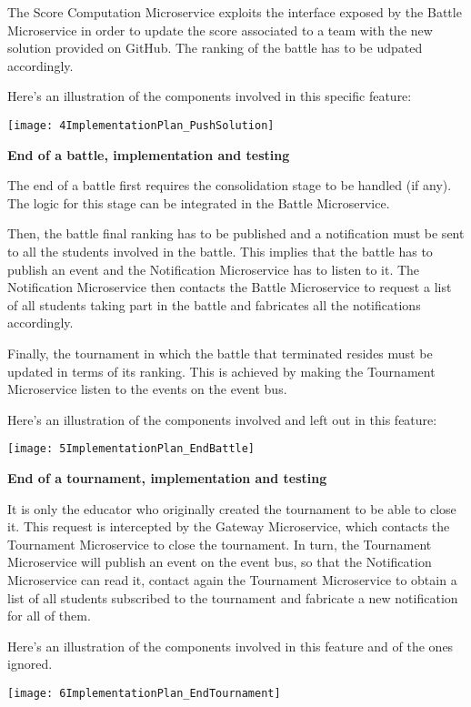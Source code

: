 The Score Computation Microservice exploits the interface exposed by the Battle Microservice in order to update the score associated to a team with the new solution provided on GitHub. The ranking of the battle has to be udpated accordingly.

Here's an illustration of the components involved in this specific feature:

\begin{center}
	\texttt{[image: 4ImplementationPlan\_PushSolution]}
\end{center}

\textbf{End of a battle, implementation and testing}

The end of a battle first requires the consolidation stage to be handled (if any). The logic for this stage can be integrated in the Battle Microservice.

Then, the battle final ranking has to be published and a notification must be sent to all the students involved in the battle. This implies that the battle has to publish an event and the Notification Microservice has to listen to it. The Notification Microservice then contacts the Battle Microservice to request a list of all students taking part in the battle and fabricates all the notifications accordingly.


Finally, the tournament in which the battle that terminated resides must be updated in terms of its ranking. This is achieved by making the Tournament Microservice listen to the events on the event bus.

Here's an illustration of the components involved and left out in this feature:

\begin{center}
	\texttt{[image: 5ImplementationPlan\_EndBattle]}
\end{center}

\textbf{End of a tournament, implementation and testing}

It is only the educator who originally created the tournament to be able to close it. This request is intercepted by the Gateway Microservice, which contacts the Tournament Microservice to close the tournament. 
In turn, the Tournament Microservice will publish an event on the event bus, so that the Notification Microservice can read it, contact again the Tournament Microservice to obtain a list of all students subscribed to the tournament and fabricate a new notification for all of them.

Here's an illustration of the components involved in this feature and of the ones ignored.

\begin{center}
	\texttt{[image: 6ImplementationPlan\_EndTournament]}
\end{center}